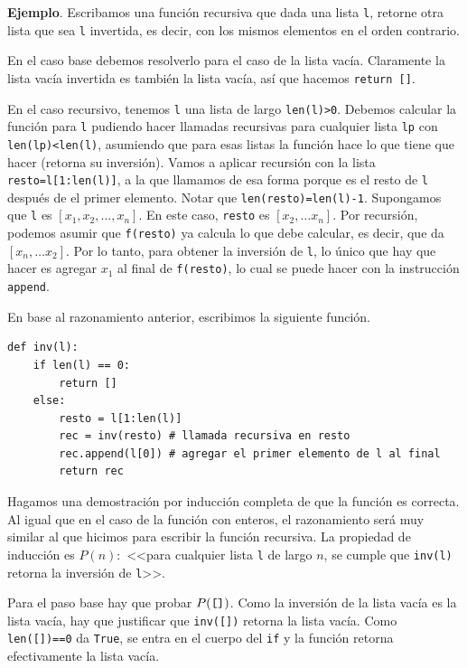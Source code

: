 \documentclass[a4paper, 12pt]{report}
\newcommand{\te}{\text}
\theoremstyle{definition}
\begin{document}
\vspace{0.5em}
{\bf Ejemplo}. Escribamos una función recursiva que dada una lista {\tt l}, retorne otra lista que sea {\tt l} invertida, es decir, con los mismos elementos en el orden contrario.

En el caso base debemos resolverlo para el caso de la lista vacía. Claramente la lista vacía invertida es también la lista vacía, así que hacemos {\tt return []}.

En el caso recursivo, tenemos {\tt l} una lista de largo {\tt len(l)>0}. Debemos calcular la función para {\tt l} pudiendo hacer llamadas recursivas para cualquier lista {\tt lp} con {\tt len(lp)<len(l)}, asumiendo que para esas listas la función hace lo que tiene que hacer (retorna su inversión). Vamos a aplicar recursión con la lista {\tt resto=l[1:len(l)]}, a la que llamamos de esa forma porque es el resto de {\tt l} después de el primer elemento. Notar que {\tt len(resto)=len(l)-1}. Supongamos que {\tt l} es $[x_1,x_2,\dots,x_n]$. En este caso, {\tt resto} es $[x_2,\dots x_n]$. Por recursión, podemos asumir que {\tt f(resto)} ya calcula lo que debe calcular, es decir, que da $[x_n,\dots x_2]$. Por lo tanto, para obtener la inversión de {\tt l}, lo único que hay que hacer es agregar $x_1$ al final de {\tt f(resto)}, lo cual se puede hacer con la instrucción {\tt append}.

En base al razonamiento anterior, escribimos la siguiente función.
\begin{verbatim}
def inv(l):
    if len(l) == 0:
        return []
    else:
        resto = l[1:len(l)]
        rec = inv(resto) # llamada recursiva en resto
        rec.append(l[0]) # agregar el primer elemento de l al final
        return rec
\end{verbatim}

Hagamos una demostración por inducción completa de que la función es correcta. Al igual que en el caso de la función con enteros, el razonamiento será muy similar al que hicimos para escribir la función recursiva. La propiedad de inducción es $P(n):$ <<para cualquier lista {\tt l} de largo $n$, se cumple que {\tt inv(l)} retorna la inversión de {\tt l}>>.

Para el paso base hay que probar $P(\te{{\tt[]}})$. Como la inversión de la lista vacía es la lista vacía, hay que justificar que {\tt inv([])} retorna la lista vacía. Como {\tt len([])==0} da {\tt True}, se entra en el cuerpo del {\tt if} y la función retorna efectivamente la lista vacía.
\end{document}
